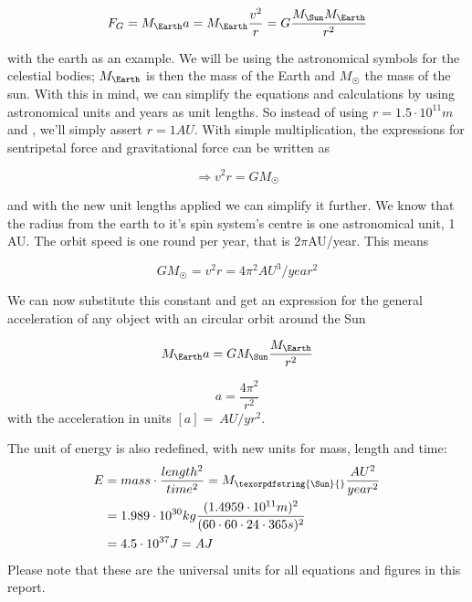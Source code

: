\documentclass[10pt]{article}
\begin{document}
\begin{multicols}{2}
\begin{equation}
    F_G = M_\Earth a = M_\Earth\frac{v^2}{r} = G\frac{M_\Sun M_\Earth}{r^2}
\end{equation}



with the earth as an example. We will be using the astronomical symbols for
the celestial bodies; $M_\Earth$ is then the mass of the Earth and $M_\Sun$ the mass
of the sun. With this in mind, we can simplify the equations and
calculations by using astronomical units and years as unit lengths. So
instead of using $r = 1.5\cdot10^{11}m$ and , we'll simply assert $r =
1AU$. With simple multiplication, the expressions for sentripetal force and
gravitational force can be written as 

\begin{equation}\label{eq:circVel}
    \Rightarrow v^2r = GM_\Sun
\end{equation}

and with the new unit lengths applied we can simplify it further. We know
that the radius from the earth to it's spin system's centre is one
astronomical unit, 1 AU. The orbit speed is one round per year, that is
2$\pi$AU/year. This means

\begin{equation}
    GM_\Sun = v^2r = 4\pi^2AU^3/year^2
\end{equation}

We can now substitute this constant and get an expression for the general
acceleration of any object with an circular orbit around the Sun

\begin{equation}
    M_\Earth a = GM_\Sun\frac{M_\Earth}{r^2}
\end{equation}

\begin{equation}
    a = \frac{4\pi^2}{r^2}
\end{equation}
with the acceleration in units $[a] = \SI{}{AU/yr^2}$. 

The unit of energy is also redefined, with new units for mass, length and time:
\begin{align}
    E &= mass\cdot\frac{length^2}{time^2} = M_\texorpdfstring{\Sun}{}\frac{AU^2}{year^2}\nonumber\\ 
    &= 1.989\cdot10^{30}kg\frac{(1.4959\cdot10^{11}m)^2}{(60\cdot60\cdot24\cdot365s)^2}\nonumber\\
    &= 4.5\cdot10^{37}J = AJ
\end{align}
Please note that these are the universal units for all equations and figures in this report.


\end{multicols}
\end{document}
